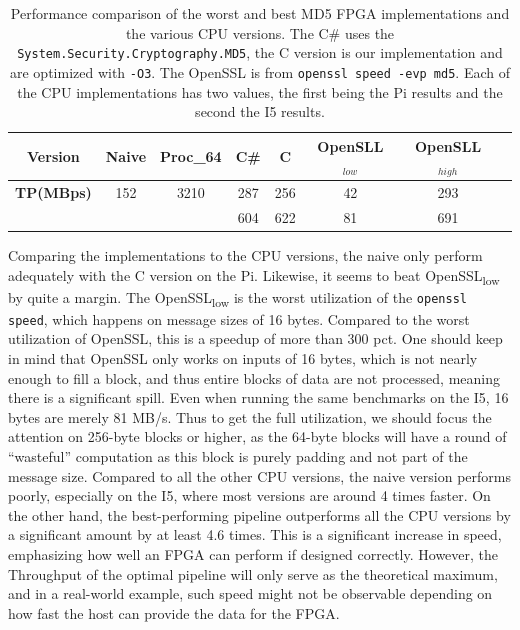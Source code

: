 \documentclass[a4paper, openany]{book}
\begin{document}
\begin{abstact}
\begin{table}[!htb]
\centering
\captionsetup{width=.8\linewidth}
\begin{tabular}{c c c c c c c c}
\hline
\textbf{Version} & Naive & Proc_{64} & C\# & C & OpenSLL$_{low}$ & OpenSLL$_{high}$\\
\hline
\textbf{TP(MBps)} & 152 & 3210 & 287 & 256 & 42 & 293\\
 & & & 604 & 622 & 81 & 691
\end{tabular}
\caption[MD5: FPGA and CPU comparisons]%
{Performance comparison of the worst and best MD5 FPGA implementations and the various CPU versions. The C\# uses the \texttt{System.Security.Cryptography.MD5}, the C version is our implementation and are optimized with \texttt{-O3}. The OpenSSL is from \texttt{openssl speed -evp md5}. Each of the CPU implementations has two values, the first being the Pi results and the second the I5 results.}
\label{tab:MD5compare}
\end{table}
Comparing the implementations to the CPU versions, the naive only perform adequately with the C version on the Pi. Likewise, it seems to beat OpenSSL\textsubscript{low} by quite a margin. The OpenSSL\textsubscript{low} is the worst utilization of the \texttt{openssl speed}, which happens on message sizes of 16 bytes. Compared to the worst utilization of OpenSSL, this is a speedup of more than 300 pct. One should keep in mind that OpenSSL only works on inputs of 16 bytes, which is not nearly enough to fill a block, and thus entire blocks of data are not processed, meaning there is a significant spill. Even when running the same benchmarks on the I5, 16 bytes are merely 81 MB/s. Thus to get the full utilization, we should focus the attention on 256-byte blocks or higher, as the 64-byte blocks will have a round of ``wasteful'' computation as this block is purely padding and not part of the message size.
Compared to all the other CPU versions, the naive version performs poorly, especially on the I5, where most versions are around 4 times faster. On the other hand, the best-performing pipeline outperforms all the CPU versions by a significant amount by at least 4.6 times. This is a significant increase in speed, emphasizing how well an FPGA can perform if designed correctly. However, the Throughput of the optimal pipeline will only serve as the theoretical maximum, and in a real-world example, such speed might not be observable depending on how fast the host can provide the data for the FPGA.

\end{abstact}
\end{document}
